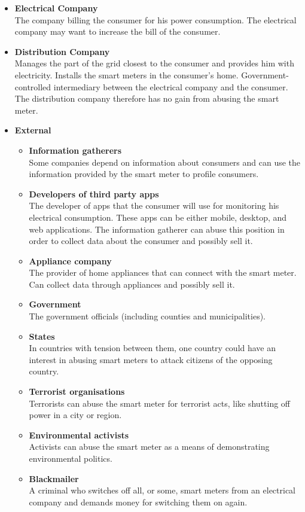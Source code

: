 \begin{itemize}
\item \textbf{Electrical Company}\\
The company billing the consumer for his power consumption.
The electrical company may want to increase the bill of the consumer.
\item \textbf{Distribution Company}\\
Manages the part of the grid closest to the consumer and provides him with electricity.
Installs the smart meters in the consumer's home.
Government-controlled intermediary between the electrical company and the consumer.
The distribution company therefore has no gain from abusing the smart meter.
\item \textbf{External}
\begin{itemize}
\item \textbf{Information gatherers}\\ 
Some companies depend on information about consumers and can use the information provided by the smart meter to profile consumers.
\item \textbf{Developers of third party apps}\\
The developer of apps that the consumer will use for monitoring his electrical consumption. 
These apps can be either mobile, desktop, and web applications.
The information gatherer can abuse this position in order to collect data about the consumer and possibly sell it.
\item \textbf{Appliance company}\\ The provider of home appliances that can connect with the smart meter.
Can collect data through appliances and possibly sell it.
\item \textbf{Government}\\
The government officials (including counties and municipalities).
\item \textbf{States}\\ In countries with tension between them, one country could have an interest in abusing smart meters to attack citizens of the opposing country.
\item \textbf{Terrorist organisations}\\ Terrorists can abuse the smart meter for terrorist acts, like shutting off power in a city or region.
\item \textbf{Environmental activists}\\ Activists can abuse the smart meter as a means of demonstrating environmental politics.
\item \textbf{Blackmailer}\\ A criminal who switches off all, or some, smart meters from an electrical company and demands money for switching them on again.
\end{itemize}
\end{itemize}

